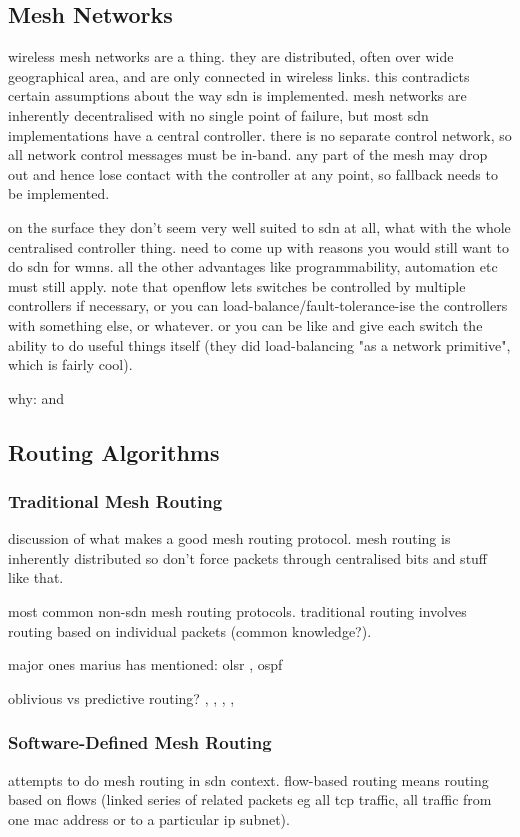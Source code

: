 \documentclass[pdftex,12pt,a4paper]{article}
\begin{document}
\subsection{Mesh Networks}
wireless mesh networks are a thing. they are distributed, often over wide geographical area, and are only connected in wireless links. this contradicts certain assumptions about the way sdn is implemented. mesh networks are inherently decentralised with no single point of failure, but most sdn implementations have a central controller. there is no separate control network, so all network control messages must be in-band. any part of the mesh may drop out and hence lose contact with the controller at any point, so fallback needs to be implemented.

on the surface they don't seem very well suited to sdn at all, what with the whole centralised controller thing. need to come up with reasons you would still want to do sdn for wmns. all the other advantages like programmability, automation etc must still apply. note that openflow lets switches be controlled by multiple controllers if necessary, or you can load-balance/fault-tolerance-ise the controllers with something else, or whatever. or you can be like \cite{handigol:asterix} and give each switch the ability to do useful things itself (they did load-balancing "as a network primitive", which is fairly cool).

why: \cite{mendonca:hetero} and \cite{dely:wmn}

\subsection{Routing Algorithms}
\subsubsection{Traditional Mesh Routing}
discussion of what makes a good mesh routing protocol. mesh routing is inherently distributed so don't force packets through centralised bits and stuff like that.

most common non-sdn mesh routing protocols. traditional routing involves routing based on individual packets (common knowledge?).

major ones marius has mentioned: olsr \cite{rfc3626}, ospf \cite{rfc5340}

oblivious vs predictive routing? \cite{wellons:augmenting}, \cite{wellons:oblivious}, \cite{dai:dynamic}, \cite{wang:routing}, 

\subsubsection{Software-Defined Mesh Routing}
attempts to do mesh routing in sdn context. flow-based routing means routing based on flows (linked series of related packets eg all tcp traffic, all traffic from one mac address or to a particular ip subnet).
\end{document}
